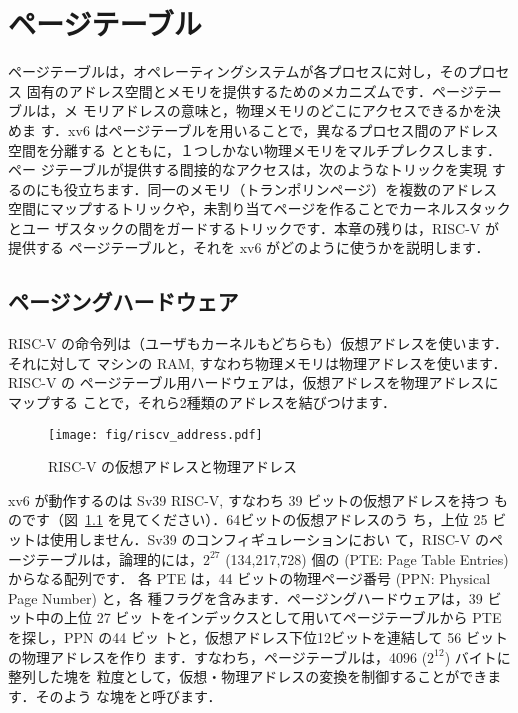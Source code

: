 \chapter{ページテーブル}
\label{CH:MEM}

ページテーブルは，オペレーティングシステムが各プロセスに対し，そのプロセス
固有のアドレス空間とメモリを提供するためのメカニズムです．ページテーブルは，メ
モリアドレスの意味と，物理メモリのどこにアクセスできるかを決めま
す．xv6 はページテーブルを用いることで，異なるプロセス間のアドレス空間を分離する
とともに，１つしかない物理メモリをマルチプレクスします．ペー
ジテーブルが提供する間接的なアクセスは，次のようなトリックを実現
するのにも役立ちます．同一のメモリ（トランポリンページ）を複数のアドレス
空間にマップするトリックや，未割り当てページを作ることでカーネルスタックとユー
ザスタックの間をガードするトリックです．本章の残りは，RISC-V が提供する
ページテーブルと，それを xv6 がどのように使うかを説明します．

\section{ページングハードウェア}
RISC-V の命令列は（ユーザもカーネルもどちらも）仮想アドレスを使います．それに対して
マシンの RAM, すなわち物理メモリは物理アドレスを使います．RISC-V の
ページテーブル用ハードウェアは，仮想アドレスを物理アドレスにマップする
ことで，それら2種類のアドレスを結びつけます．


\begin{figure}[t]
\center
\texttt{[image: fig/riscv\_address.pdf]}
\caption{RISC-V の仮想アドレスと物理アドレス}
\label{fig:riscv_address}
\end{figure}

xv6 が動作するのは Sv39 RISC-V, すなわち 39 ビットの仮想アドレスを持つ
ものです（図~\ref{fig:riscv_address} を見てください）．64ビットの仮想アドレスのう
ち，上位 25 ビットは使用しません．Sv39 のコンフィギュレーションにおい
て，RISC-V のページテーブルは，論理的には，$2^{27}$ (134,217,728) 個の
 (PTE: Page Table Entries) からなる配列です．
各 PTE は，44 ビットの物理ページ番号 (PPN: Physical Page Number) と，各
種フラグを含みます．ページングハードウェアは，39 ビット中の上位 27 ビッ
トをインデックスとして用いてページテーブルから PTE を探し，PPN の44 ビッ
トと，仮想アドレス下位12ビットを連結して 56 ビットの物理アドレスを作り
ます．すなわち，ページテーブルは，4096 ($2^{12}$) バイトに整列した塊を
粒度として，仮想・物理アドレスの変換を制御することができます．そのよう
な塊をと呼びます．

